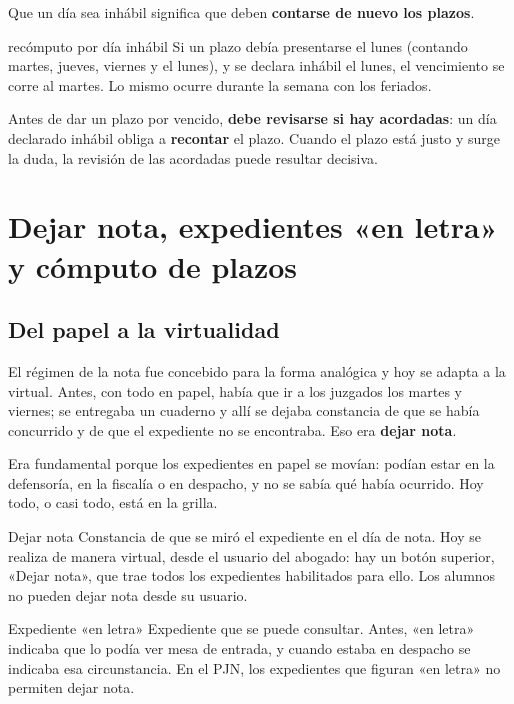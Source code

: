 \documentclass[12pt,oneside]{book}
\begin{document}
Que un día sea inhábil significa que deben \textbf{contarse de nuevo los plazos}.

\begin{example}{recómputo por día inhábil}
Si un plazo debía presentarse el lunes (contando martes, jueves, viernes y el lunes), y se declara inhábil el lunes, el vencimiento se corre al martes. Lo mismo ocurre durante la semana con los feriados.
\end{example}

\begin{important}
Antes de dar un plazo por vencido, \textbf{debe revisarse si hay acordadas}: un día declarado inhábil obliga a \textbf{recontar} el plazo. Cuando el plazo está justo y surge la duda, la revisión de las acordadas puede resultar decisiva.
\end{important}

\section{Dejar nota, expedientes «en letra» y cómputo de plazos}

\subsection{Del papel a la virtualidad}

El régimen de la nota fue concebido para la forma analógica y hoy se adapta a la virtual. Antes, con todo en papel, había que ir a los juzgados los martes y viernes; se entregaba un cuaderno y allí se dejaba constancia de que se había concurrido y de que el expediente no se encontraba. Eso era \textbf{dejar nota}.

Era fundamental porque los expedientes en papel se movían: podían estar en la defensoría, en la fiscalía o en despacho, y no se sabía qué había ocurrido. Hoy todo, o casi todo, está en la grilla.

\begin{definition}{Dejar nota}
Constancia de que se miró el expediente en el día de nota. Hoy se realiza de manera virtual, desde el usuario del abogado: hay un botón superior, «Dejar nota», que trae todos los expedientes habilitados para ello. Los alumnos no pueden dejar nota desde su usuario.
\end{definition}

\begin{definition}{Expediente «en letra»}
Expediente que se puede consultar. Antes, «en letra» indicaba que lo podía ver mesa de entrada, y cuando estaba en despacho se indicaba esa circunstancia. En el PJN, los expedientes que figuran «en letra» no permiten dejar nota.
\end{definition}
\end{document}
